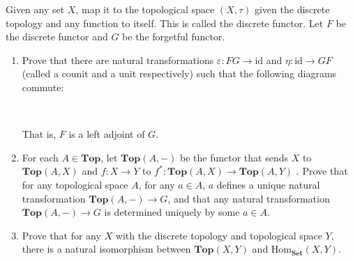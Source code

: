 \documentclass[12pt,reqno]{amsart}
\numberwithin{theorem}{section}
\theoremstyle{definition}
\theoremstyle{remark}
\numberwithin{equation}{section}
\theoremstyle{definition}
\newcommand{\id}{\mathrm{id}}
\renewcommand{\hom}{\mathrm{Hom}}
\begin{document}
\begin{exercise}[Extra]
Given any set $X$, map it to the topological space $(X,\tau)$ given the discrete topology and any function to itself. This is called the discrete functor. Let $F $ be the discrete functor and $G$ be the forgetful functor.
\begin{enumerate}
    \item Prove that there are natural transformations $\varepsilon:FG\rightarrow \id$ and $\eta: \id \rightarrow GF$ (called a counit and a unit respectively) such that the following diagrams commute:
    \begin{center}
         \\
    \end{center}
    That is, $F$ is a left adjoint of $G$.
    \item For each $A \in \mathbf{Top}$, let $\mathbf{Top}(A,-)$ be the functor that sends $X$ to $\mathbf{Top}(A,X)$ and $f:X\rightarrow Y$ to $f^* : \mathbf{Top}(A,X)\rightarrow \mathbf{Top}(A,Y)$ . Prove that for any topological space $A$, for any $a \in A$, $a$ defines a unique natural transformation $\mathbf{Top}(A,-) \rightarrow G$, and that any natural transformation $\mathbf{Top}(A,-) \rightarrow G$ is determined uniquely by some $a \in A$. 
\item Prove that for any $X$ with the discrete topology and topological space $Y$, there is a natural isomorphism between $\mathbf{Top}(X,Y)$ and $\hom_{\mathbf{Set}}(X,Y)$.
\end{enumerate}
\end{exercise}


\printbibliography
\end{document}
